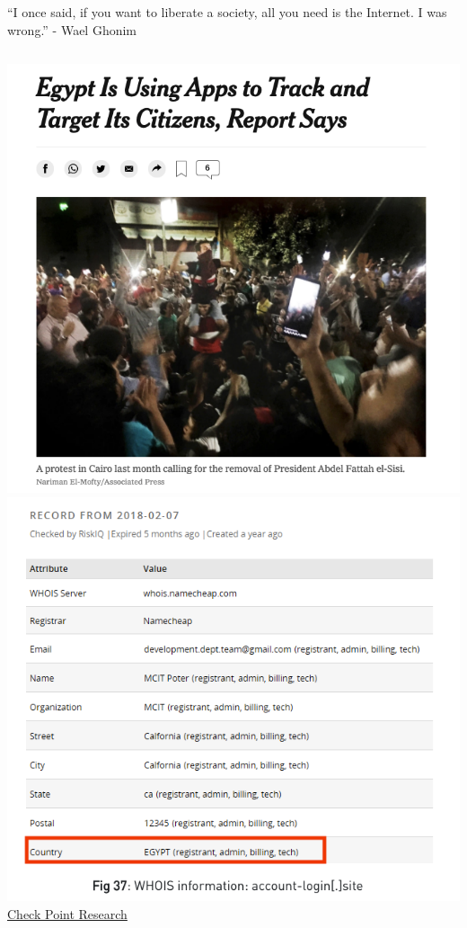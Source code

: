 \documentclass[nobackground,dvipsnames,table,aspectratio=169]{beamer}
\begin{document}
\begin{frame}{“I once said, if you want to liberate a society, all you need is the Internet. I was wrong.” - Wael Ghonim}
    \begin{columns}
            \includegraphics[width=\textwidth]{egypt-tracking-citizens}
            \includegraphics[width=\textwidth]{egypt-tracking-evidence}
            \href{https://research.checkpoint.com/2019/the-eye-on-the-nile/}{Check Point Research}
    \end{columns}
\end{frame}
\end{document}
